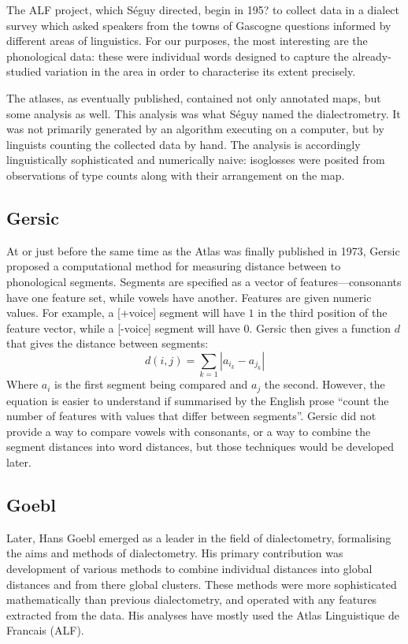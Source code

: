 \documentclass[11pt]{article}
\begin{document}
The ALF project, which S\'eguy directed, begin in 195? to collect data
in a dialect survey which asked speakers from the towns of Gascogne
questions informed by different areas of linguistics. For our
purposes, the most interesting are the phonological data: these were
individual words designed to capture the already-studied variation in
the area in order to characterise its extent precisely.

The atlases, as eventually published, contained not only annotated
maps, but some analysis as well. This analysis was what S\'eguy named
the dialectrometry. It was not primarily generated by an
algorithm executing on a computer, but by linguists
counting the collected data by hand. The analysis is accordingly
linguistically sophisticated and numerically naive: isoglosses were
posited from observations of type counts along with their arrangement
on the map.

\subsection{Gersic}
At or just before the same time as the Atlas was finally published in
1973, Gersic proposed a computational method for measuring distance
between to phonological segments. Segments are specified as a vector
of features---consonants have
one feature set, while vowels have another. Features are given numeric
values. For example, a [+voice] segment will have $1$ in the third
position of the feature vector, while a [-voice] segment will have
$0$. Gersic then gives a
function $d$ that gives the distance between segments:
\[ d(i,j) = \sum_{k=1} |a_{i_k} - a_{j_k}|\] Where $a_i$ is the first
segment
being compared and $a_j$ the second. However, the equation is easier
to understand if summarised by the English prose ``count the number of
features with values that differ between segments''. Gersic did not
provide a way to compare vowels with consonants, or a way to combine
the segment distances into word distances, but those techniques would
be developed later.

\subsection{Goebl}

Later, Hans Goebl emerged as a leader in the field of dialectometry,
formalising the aims and methods of dialectometry. His primary
contribution was development of various methods to combine individual
distances into global distances and from there global clusters. These
methods were more sophisticated mathematically than previous
dialectometry, and operated with any features extracted from the data. His
analyses have mostly used the Atlas Linguistique de Francais
(ALF).
\end{document}
